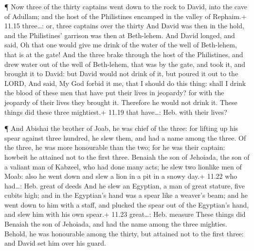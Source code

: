  ¶ Now three of the thirty captains went down to the rock
to David, into the cave of Adullam; and the host of the Philistines
encamped in the valley of Rephaim.+ 11.15 three\ldots: or, three
captains over the thirty  And David was then in the hold,
and the Philistines' garrison was then at Beth-lehem.  And
David longed, and said, Oh that one would give me drink of the water of
the well of Beth-lehem, that is at the gate!  And the three
brake through the host of the Philistines, and drew water out of the
well of Beth-lehem, that was by the gate, and took it, and brought it to
David: but David would not drink of it, but poured it out to the LORD,
 And said, My God forbid it me, that I should do this
thing: shall I drink the blood of these men that have put their lives in
jeopardy? for with the jeopardy of their lives they brought it.
Therefore he would not drink it. These things did these three
mightiest.+ 11.19 that have\ldots: Heb. with their lives?

 ¶ And Abishai the brother of Joab, he was chief of the
three: for lifting up his spear against three hundred, he slew them, and
had a name among the three.  Of the three, he was more
honourable than the two; for he was their captain: howbeit he attained
not to the first three.  Benaiah the son of Jehoiada, the
son of a valiant man of Kabzeel, who had done many acts; he slew two
lionlike men of Moab: also he went down and slew a lion in a pit in a
snowy day.+ 11.22 who had\ldots: Heb. great of deeds  And
he slew an Egyptian, a man of great stature, five cubits high; and in
the Egyptian's hand was a spear like a weaver's beam; and he went down
to him with a staff, and plucked the spear out of the Egyptian's hand,
and slew him with his own spear.+ 11.23 great\ldots: Heb. measure
 These things did Benaiah the son of Jehoiada, and had the
name among the three mighties.  Behold, he was honourable
among the thirty, but attained not to the first three: and David set him
over his guard.

